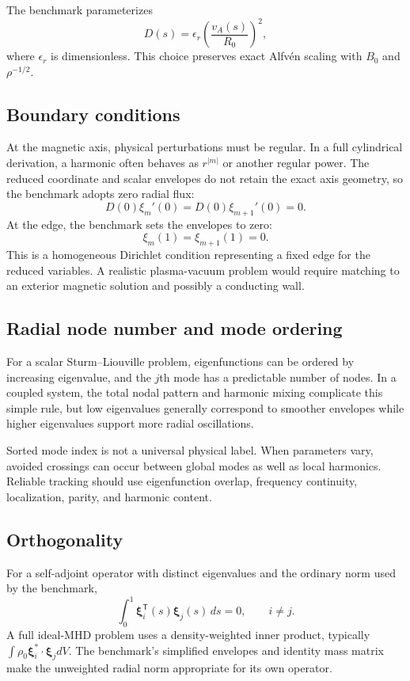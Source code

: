 The benchmark parameterizes
\begin{equation}
D(s)=\epsilon_r\left(\frac{v_A(s)}{R_0}\right)^2,
\end{equation}
where $\epsilon_r$ is dimensionless. This choice preserves exact Alfv\'en scaling with $B_0$ and $\rho^{-1/2}$.

\subsection{Boundary conditions}
At the magnetic axis, physical perturbations must be regular. In a full cylindrical derivation, a harmonic often behaves as $r^{|m|}$ or another regular power. The reduced coordinate and scalar envelopes do not retain the exact axis geometry, so the benchmark adopts zero radial flux:
\begin{equation}
D(0)\xi_m'(0)=D(0)\xi_{m+1}'(0)=0.
\label{eq:global_axis_bc_textbook}
\end{equation}
At the edge, the benchmark sets the envelopes to zero:
\begin{equation}
\xi_m(1)=\xi_{m+1}(1)=0.
\label{eq:global_edge_bc_textbook}
\end{equation}
This is a homogeneous Dirichlet condition representing a fixed edge for the reduced variables. A realistic plasma-vacuum problem would require matching to an exterior magnetic solution and possibly a conducting wall.

\subsection{Radial node number and mode ordering}
For a scalar Sturm--Liouville problem, eigenfunctions can be ordered by increasing eigenvalue, and the $j$th mode has a predictable number of nodes. In a coupled system, the total nodal pattern and harmonic mixing complicate this simple rule, but low eigenvalues generally correspond to smoother envelopes while higher eigenvalues support more radial oscillations.

Sorted mode index is not a universal physical label. When parameters vary, avoided crossings can occur between global modes as well as local harmonics. Reliable tracking should use eigenfunction overlap, frequency continuity, localization, parity, and harmonic content.

\subsection{Orthogonality}
For a self-adjoint operator with distinct eigenvalues and the ordinary norm used by the benchmark,
\begin{equation}
\int_0^1\boldsymbol\xi_i^{\mathsf T}(s)\boldsymbol\xi_j(s)\,ds=0,
\qquad i\neq j.
\label{eq:continuous_orthogonality}
\end{equation}
A full ideal-MHD problem uses a density-weighted inner product, typically $\int\rho_0\boldsymbol\xi_i^*\cdot\boldsymbol\xi_jdV$. The benchmark's simplified envelopes and identity mass matrix make the unweighted radial norm appropriate for its own operator.

